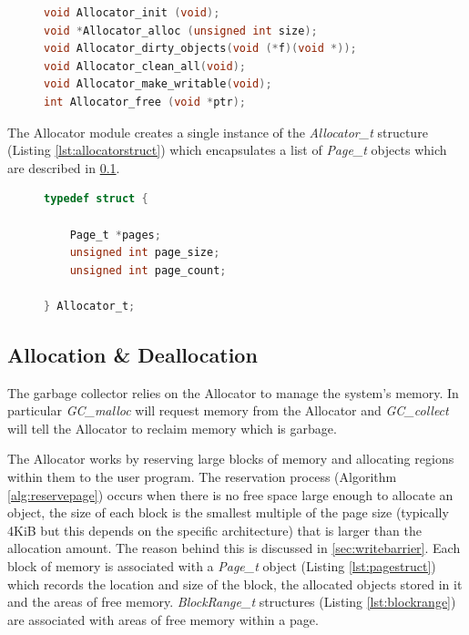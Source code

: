 \documentclass[../diss.tex]{subfiles}
\begin{document}
\begin{figure}
\begin{lstlisting}[language=C, caption=The Allocator interface with comments removed, label={lst:allocatorinterface}]
void Allocator_init (void);
void *Allocator_alloc (unsigned int size);
void Allocator_dirty_objects(void (*f)(void *));
void Allocator_clean_all(void);
void Allocator_make_writable(void);
int Allocator_free (void *ptr);
\end{lstlisting}
\end{figure}

The Allocator module creates a single instance of the \emph{Allocator\_t} structure (Listing \ref{lst:allocatorstruct}) which encapsulates a list of \emph{Page\_t} objects which are described in \cref{sec:allocation}.

\begin{figure}
\begin{lstlisting}[language=C, caption=Allocator\_t structure with comments removed, label={lst:allocatorstruct}]
typedef struct {

    Page_t *pages;
    unsigned int page_size;
    unsigned int page_count;

} Allocator_t;
\end{lstlisting}
\end{figure}

\subsection{Allocation \& Deallocation} \label{sec:allocation}

The garbage collector relies on the Allocator to manage the system's memory. In particular \emph{GC\_malloc} will request memory from the Allocator and \emph{GC\_collect} will tell the Allocator to reclaim memory which is garbage.

The Allocator works by reserving large blocks of memory and allocating regions within them to the user program. The reservation process (Algorithm \ref{alg:reservepage}) occurs when there is no free space large enough to allocate an object, the size of each block is the smallest multiple of the page size (typically 4KiB but this depends on the specific architecture) that is larger than the allocation amount. The reason behind this is discussed in \cref{sec:writebarrier}. Each block of memory is associated with a \emph{Page\_t} object (Listing \ref{lst:pagestruct}) which records the location and size of the block, the allocated objects stored in it and the areas of free memory. \emph{BlockRange\_t} structures (Listing \ref{lst:blockrange}) are associated with areas of free memory within a page.
\end{document}
